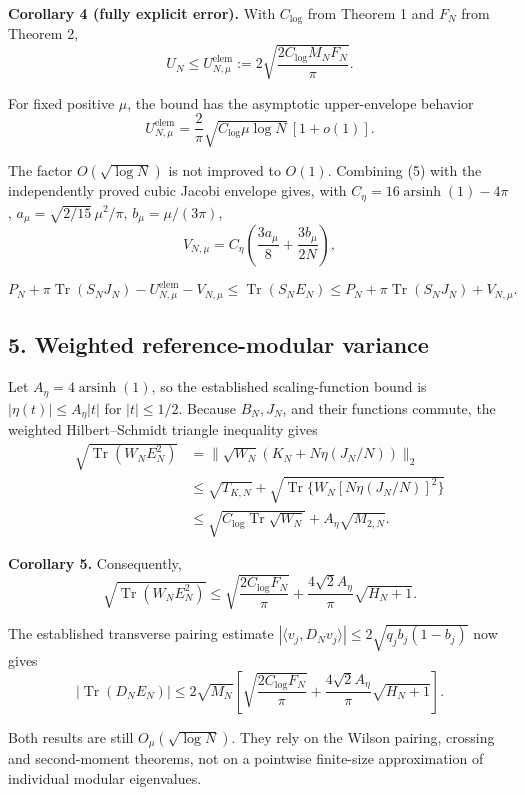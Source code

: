 \documentclass[
  10pt,
  a4paper,
]{article}
\begin{document}
\textbf{Corollary 4 (fully explicit error).} With \(C_{\log}\) from Theorem 1 and \(F_N\) from Theorem 2, \[
\boxed{U_N\le U^{\mathrm{elem}}_{N,\mu}
:=2\sqrt{\frac{2C_{\log}M_NF_N}{\pi}}.}\tag{6}
\]

For fixed positive \(\mu\), the bound has the asymptotic upper-envelope behavior \[
U^{\mathrm{elem}}_{N,\mu}
=\frac2\pi\sqrt{C_{\log}\mu\log N}\,[1+o(1)].\tag{7}
\]

The factor \(O(\sqrt{\log N})\) is not improved to \(O(1)\). Combining (5) with the independently proved cubic Jacobi envelope gives, with \(C_\eta=16\operatorname{arsinh}(1)-4\pi\), \(a_\mu=\sqrt{2/15}\,\mu^2/\pi\), \(b_\mu=\mu/(3\pi)\), \[
V_{N,\mu}=C_\eta\left(\frac{3a_\mu}8+\frac{3b_\mu}{2N}\right),
\]

\[
\boxed{
P_N+\pi\operatorname{Tr}(S_NJ_N)-U^{\mathrm{elem}}_{N,\mu}-V_{N,\mu}
\le\operatorname{Tr}(S_NE_N)
\le P_N+\pi\operatorname{Tr}(S_NJ_N)+V_{N,\mu}.}\tag{8}
\]

\subsection{5. Weighted reference-modular variance}\label{weighted-reference-modular-variance}

Let \(A_\eta=4\operatorname{arsinh}(1)\), so the established scaling-function bound is \(|\eta(t)|\le A_\eta|t|\) for \(|t|\le1/2\). Because \(B_N,J_N\), and their functions commute, the weighted Hilbert--Schmidt triangle inequality gives \[
\begin{split}
\sqrt{\operatorname{Tr}(W_NE_N^2)}
&=\|\sqrt{W_N}(K_N+N\eta(J_N/N))\|_2\\
&\le\sqrt{T_{K,N}}
+\sqrt{\operatorname{Tr}\{W_N[N\eta(J_N/N)]^2\}}\\
&\le\sqrt{C_{\log}\operatorname{Tr}\sqrt{W_N}}
+A_\eta\sqrt{M_{2,N}}.
\end{split}
\]

\textbf{Corollary 5.} Consequently, \[
\boxed{\sqrt{\operatorname{Tr}(W_NE_N^2)}
\le\sqrt{\frac{2C_{\log}F_N}{\pi}}
+\frac{4\sqrt2 A_\eta}{\pi}\sqrt{H_N+1}.}\tag{9}
\]

The established transverse pairing estimate \(|\langle v_j,D_Nv_j\rangle|\le2\sqrt{q_jb_j(1-b_j)}\) now gives \[
\boxed{\left|\operatorname{Tr}(D_NE_N)\right|
\le2\sqrt{M_N}\left[
\sqrt{\frac{2C_{\log}F_N}{\pi}}
+\frac{4\sqrt2 A_\eta}{\pi}\sqrt{H_N+1}
\right].}\tag{10}
\]

Both results are still \(O_\mu(\sqrt{\log N})\). They rely on the Wilson pairing, crossing and second-moment theorems, not on a pointwise finite-size approximation of individual modular eigenvalues.
\end{document}
